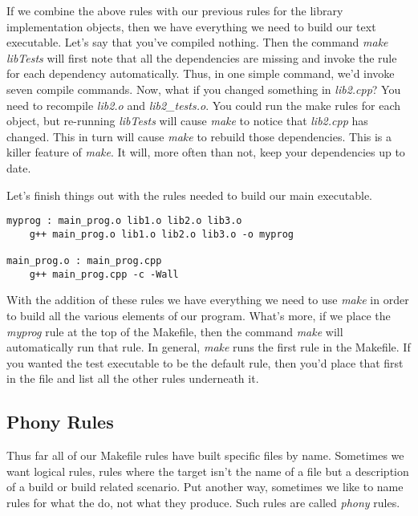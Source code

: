 \documentclass[]{tufte-handout}
\begin{document}
If we combine the above rules with our previous rules for the library implementation objects, then we have everything we need to build our text executable.  Let's say that you've compiled nothing. Then the command \textit{make libTests} will first note that all the dependencies are missing and invoke the rule for each dependency automatically.  Thus, in one simple command, we'd invoke seven compile commands.  Now, what if you changed something in \textit{lib2.cpp}? You need to recompile \textit{lib2.o} and \textit{lib2\_tests.o}. You could run the make rules for each object, but re-running \textit{libTests} will cause \textit{make} to notice that \textit{lib2.cpp} has changed. This in turn will cause \textit{make} to rebuild those dependencies.  This is a killer feature of \textit{make}. It will, more often than not, keep your dependencies up to date. 

Let's finish things out with the rules needed to build our main executable.
\begin{verbatim}
myprog : main_prog.o lib1.o lib2.o lib3.o
    g++ main_prog.o lib1.o lib2.o lib3.o -o myprog

main_prog.o : main_prog.cpp
    g++ main_prog.cpp -c -Wall
\end{verbatim} 
With the addition of these rules we have everything we need to use \textit{make} in order to build all the various elements of our program.  What's more, if we place the \textit{myprog} rule at the top of the Makefile, then the command \textit{make} will automatically run that rule.  In general, \textit{make} runs the first rule in the Makefile.  If you wanted the test executable to be the default rule, then you'd place that first in the file and list all the other rules underneath it. 

\subsection{Phony Rules}

Thus far all of our Makefile rules have built specific files by name.  Sometimes we want logical rules, rules where the target isn't the name of a file but a description of a build or build related scenario.  Put another way, sometimes we like to name rules for what the do, not what they produce. Such rules are called \textit{phony} rules.
\end{document}
